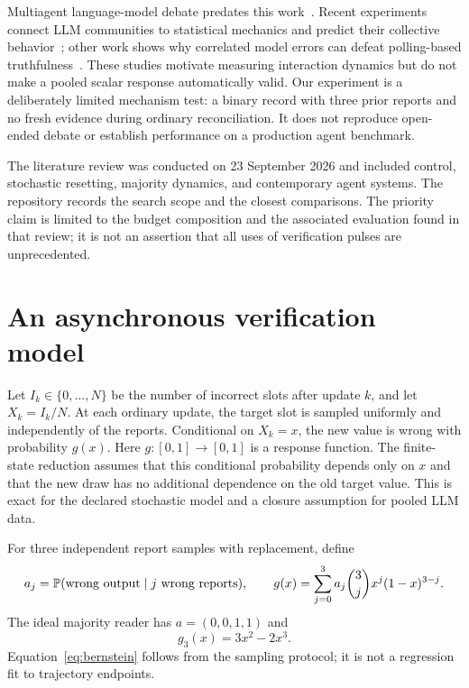 \documentclass[11pt]{article}
\theoremstyle{remark}\newtheorem{remark}[theorem]{Remark}
\begin{document}
Multiagent language-model debate predates this work~\citep{du2024}. Recent experiments connect LLM communities to statistical mechanics and predict their collective behavior~\citep{el2026}; other work shows why correlated model errors can defeat polling-based truthfulness~\citep{denisov2026}. These studies motivate measuring interaction dynamics but do not make a pooled scalar response automatically valid. Our experiment is a deliberately limited mechanism test: a binary record with three prior reports and no fresh evidence during ordinary reconciliation. It does not reproduce open-ended debate or establish performance on a production agent benchmark.

The literature review was conducted on 23 September 2026 and included control, stochastic resetting, majority dynamics, and contemporary agent systems. The repository records the search scope and the closest comparisons. The priority claim is limited to the budget composition and the associated evaluation found in that review; it is not an assertion that all uses of verification pulses are unprecedented.

\section{An asynchronous verification model}
\label{sec:model}
Let $I_k\in\{0,\ldots,N\}$ be the number of incorrect slots after update $k$, and let $X_k=I_k/N$. At each ordinary update, the target slot is sampled uniformly and independently of the reports. Conditional on $X_k=x$, the new value is wrong with probability $g(x)$. Here $g:[0,1]\to[0,1]$ is a response function. The finite-state reduction assumes that this conditional probability depends only on $x$ and that the new draw has no additional dependence on the old target value. This is exact for the declared stochastic model and a closure assumption for pooled LLM data.

For three independent report samples with replacement, define
\begin{equation}
 a_j=\mathbb P(\text{wrong output}\mid j\text{ wrong reports}),\qquad
 g(x)=\sum_{j=0}^3 a_j {3\choose j}x^j(1-x)^{3-j}.
 \label{eq:bernstein}
\end{equation}
The ideal majority reader has $a=(0,0,1,1)$ and
\begin{equation}
 g_3(x)=3x^2-2x^3.
 \label{eq:majority}
\end{equation}
Equation~\eqref{eq:bernstein} follows from the sampling protocol; it is not a regression fit to trajectory endpoints.
\end{document}
